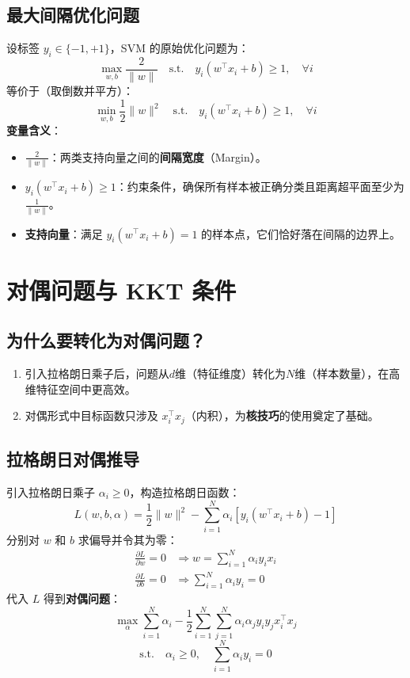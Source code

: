 \documentclass[12pt, a4paper]{article}
\begin{document}
\subsection{最大间隔优化问题}
设标签 $y_i \in \{-1, +1\}$，SVM 的原始优化问题为：
$$ \max_{w, b} \frac{2}{\|w\|} \quad \text{s.t.} \quad y_i(w^\top x_i + b) \geq 1, \quad \forall i $$
等价于（取倒数并平方）：
$$ \min_{w, b} \frac{1}{2} \|w\|^2 \quad \text{s.t.} \quad y_i(w^\top x_i + b) \geq 1, \quad \forall i $$
\textbf{变量含义}：
\begin{itemize}
    \item $\frac{2}{\|w\|}$：两类支持向量之间的\textbf{间隔宽度}（Margin）。
    \item $y_i(w^\top x_i + b) \geq 1$：约束条件，确保所有样本被正确分类且距离超平面至少为 $\frac{1}{\|w\|}$。
    \item \textbf{支持向量}：满足 $y_i(w^\top x_i + b) = 1$ 的样本点，它们恰好落在间隔的边界上。
\end{itemize}

\section{对偶问题与 KKT 条件}

\subsection{为什么要转化为对偶问题？}
\begin{enumerate}
    \item 引入拉格朗日乘子后，问题从$d$维（特征维度）转化为$N$维（样本数量），在高维特征空间中更高效。
    \item 对偶形式中目标函数只涉及 $x_i^\top x_j$（内积），为\textbf{核技巧}的使用奠定了基础。
\end{enumerate}

\subsection{拉格朗日对偶推导}
引入拉格朗日乘子 $\alpha_i \geq 0$，构造拉格朗日函数：
$$ L(w, b, \alpha) = \frac{1}{2}\|w\|^2 - \sum_{i=1}^N \alpha_i \left[ y_i(w^\top x_i + b) - 1 \right] $$
分别对 $w$ 和 $b$ 求偏导并令其为零：
\begin{align}
\frac{\partial L}{\partial w} = 0 &\Rightarrow w = \sum_{i=1}^N \alpha_i y_i x_i \\
\frac{\partial L}{\partial b} = 0 &\Rightarrow \sum_{i=1}^N \alpha_i y_i = 0
\end{align}
代入 $L$ 得到\textbf{对偶问题}：
$$ \max_\alpha \sum_{i=1}^N \alpha_i - \frac{1}{2} \sum_{i=1}^N \sum_{j=1}^N \alpha_i \alpha_j y_i y_j x_i^\top x_j $$
$$ \text{s.t.} \quad \alpha_i \geq 0, \quad \sum_{i=1}^N \alpha_i y_i = 0 $$
\end{document}
